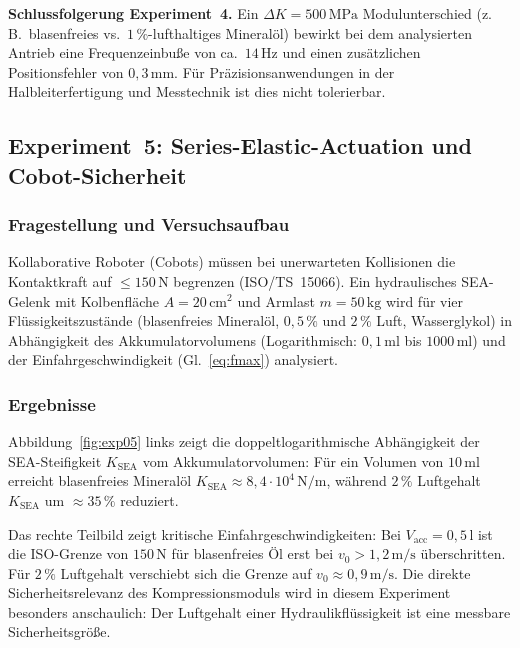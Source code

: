 ﻿\documentclass[a4paper,12pt]{scrreprt}
\theoremstyle{definition}
\begin{document}
\begin{infobox}
\textbf{Schlussfolgerung Experiment~4.}
Ein $\Delta K = 500\,\mathrm{MPa}$ Modulunterschied (z.\,B.\ blasenfreies
vs.\ $1\,\%$-lufthaltiges Mineralöl) bewirkt bei dem analysierten Antrieb
eine Frequenzeinbuße von ca.\ $14\,\mathrm{Hz}$ und einen zusätzlichen
Positionsfehler von $0{,}3\,\mathrm{mm}$. Für Präzisionsanwendungen in
der Halbleiterfertigung und Messtechnik ist dies nicht tolerierbar.
\end{infobox}

\subsection{Experiment~5: Series-Elastic-Actuation und Cobot-Sicherheit}
\label{sec:exp05}

\subsubsection*{Fragestellung und Versuchsaufbau}

Kollaborative Roboter (Cobots) müssen bei unerwarteten Kollisionen
die Kontaktkraft auf ${\leq}150\,\mathrm{N}$ begrenzen (ISO/TS~15066).
Ein hydraulisches SEA-Gelenk mit Kolbenfläche $A = 20\,\mathrm{cm^2}$ und
Armlast $m = 50\,\mathrm{kg}$ wird für vier Flüssigkeitszustände
(blasenfreies Mineralöl, $0{,}5\,\%$ und $2\,\%$ Luft, Wasserglykol)
in Abhängigkeit des Akkumulatorvolumens (Logarithmisch: $0{,}1\,\mathrm{ml}$
bis $1000\,\mathrm{ml}$) und der Einfahrgeschwindigkeit (Gl.~\ref{eq:fmax}) analysiert.

\subsubsection*{Ergebnisse}

Abbildung~\ref{fig:exp05} links zeigt die doppeltlogarithmische Abhängigkeit
der SEA-Steifigkeit $K_{\mathrm{SEA}}$ vom Akkumulatorvolumen: Für ein
Volumen von $10\,\mathrm{ml}$ erreicht blasenfreies Mineralöl
$K_{\mathrm{SEA}} \approx 8{,}4 \cdot 10^4\,\mathrm{N/m}$, während
$2\,\%$ Luftgehalt $K_{\mathrm{SEA}}$ um $\approx 35\,\%$ reduziert.

Das rechte Teilbild zeigt kritische Einfahrgeschwindigkeiten: Bei
$V_{\mathrm{acc}} = 0{,}5\,\mathrm{l}$ ist die ISO-Grenze von
$150\,\mathrm{N}$ für blasenfreies Öl erst bei $v_0 > 1{,}2\,\mathrm{m/s}$
überschritten. Für $2\,\%$ Luftgehalt verschiebt sich die Grenze auf
$v_0 \approx 0{,}9\,\mathrm{m/s}$. Die direkte Sicherheitsrelevanz des
Kompressionsmoduls wird in diesem Experiment besonders anschaulich: Der
Luftgehalt einer Hydraulikflüssigkeit ist eine messbare Sicherheitsgröße.
\end{document}
